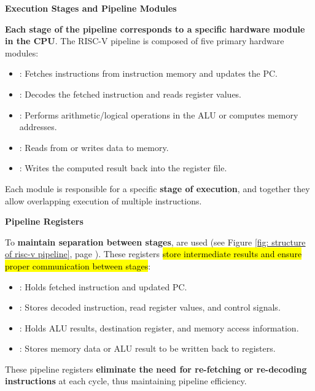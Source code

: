 \begin{flushleft}
    \textcolor{Green3}{ \textbf{Execution Stages and Pipeline Modules}}
\end{flushleft}
\textbf{Each stage of the pipeline corresponds to a specific hardware module in the CPU}. The RISC-V pipeline is composed of five primary hardware modules:
\begin{itemize}
    \item {}: Fetches instructions from instruction memory and updates the PC.
    \item {}: Decodes the fetched instruction and reads register values.
    \item {}: Performs arithmetic/logical operations in the ALU or computes memory addresses.
    \item {}: Reads from or writes data to memory.
    \item {}: Writes the computed result back into the register file.
\end{itemize}
Each module is responsible for a specific \textbf{stage of execution}, and together they allow overlapping execution of multiple instructions.

\highspace
\begin{flushleft}
    \textcolor{Green3}{ \textbf{Pipeline Registers}}
\end{flushleft}
To \textbf{maintain separation between stages},  are used (see Figure \ref{fig: structure of risc-v pipeline}, page \pageref{fig: structure of risc-v pipeline}). These registers \hl{store intermediate results and ensure proper communication between stages}:
\begin{itemize}
    \item {}: Holds fetched instruction and updated PC.
    \item {}: Stores decoded instruction, read register values, and control signals.
    \item {}: Holds ALU results, destination register, and memory access information.
    \item {}: Stores memory data or ALU result to be written back to registers.
\end{itemize}
These pipeline registers \textbf{eliminate the need for re-fetching or re-decoding instructions} at each cycle, thus maintaining pipeline efficiency.